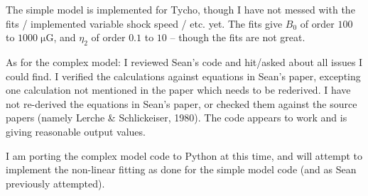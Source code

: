 \documentclass[10pt]{article}
\newcommand{\mt}{\mathrm}
\newcommand{\unit}[1]{\; \mt{#1}} %
\begin{document}
The simple model is implemented for Tycho, though I have not messed with the
fits / implemented variable shock speed / etc. yet.  The fits give $B_0$
of order $100$ to $1000 \unit{\mu G}$, and $\eta_2$ of order $0.1$ to $10$ --
though the fits are not great.

As for the complex model: I reviewed Sean's code and hit/asked about all issues
I could find.
I verified the calculations against equations in Sean's paper, excepting one
calculation not mentioned in the paper which needs to be rederived.
I have not re-derived the equations in Sean's paper, or checked them against
the source papers (namely Lerche \& Schlickeiser, 1980).
The code appears to work and is giving reasonable output values.

I am porting the complex model code to Python at this time, and will attempt to
implement the non-linear fitting as done for the simple model code (and as Sean
previously attempted).
\end{document}
